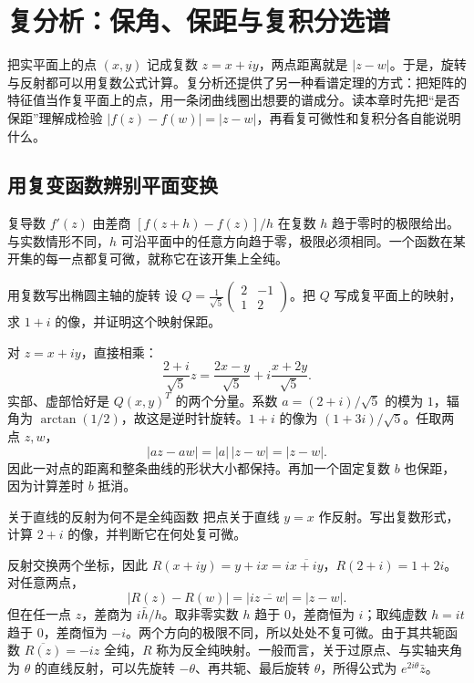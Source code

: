 \chapter{复分析：保角、保距与复积分选谱}
\label{chap:complex}

把实平面上的点 $(x,y)$ 记成复数 $z=x+iy$，两点距离就是 $|z-w|$。于是，旋转与反射都可以用复数公式计算。复分析还提供了另一种看谱定理的方式：把矩阵的特征值当作复平面上的点，用一条闭曲线圈出想要的谱成分。读本章时先把“是否保距”理解成检验 $|f(z)-f(w)|=|z-w|$，再看复可微性和复积分各自能说明什么。

\section{用复变函数辨别平面变换}

复导数 $f'(z)$ 由差商 $[f(z+h)-f(z)]/h$ 在复数 $h$ 趋于零时的极限给出。与实数情形不同，$h$ 可沿平面中的任意方向趋于零，极限必须相同。一个函数在某开集的每一点都复可微，就称它在该开集上全纯。

\begin{example}{用复数写出椭圆主轴的旋转}
设 $Q=\frac1{\sqrt5}\begin{pmatrix}2&-1\\1&2\end{pmatrix}$。把 $Q$ 写成复平面上的映射，求 $1+i$ 的像，并证明这个映射保距。
\end{example}
\begin{solution}
对 $z=x+iy$，直接相乘：
\[
 \frac{2+i}{\sqrt5}z=\frac{2x-y}{\sqrt5}+i\frac{x+2y}{\sqrt5}.
\]
实部、虚部恰好是 $Q(x,y)^T$ 的两个分量。系数 $a=(2+i)/\sqrt5$ 的模为 $1$，辐角为 $\arctan(1/2)$，故这是逆时针旋转。$1+i$ 的像为 $(1+3i)/\sqrt5$。任取两点 $z,w$，
\[
 |az-aw|=|a|\,|z-w|=|z-w|.
\]
因此一对点的距离和整条曲线的形状大小都保持。再加一个固定复数 $b$ 也保距，因为计算差时 $b$ 抵消。
\end{solution}

\begin{example}{关于直线的反射为何不是全纯函数}
把点关于直线 $y=x$ 作反射。写出复数形式，计算 $2+i$ 的像，并判断它在何处复可微。
\end{example}
\begin{solution}
反射交换两个坐标，因此 $R(x+iy)=y+ix=i\overline{x+iy}$，$R(2+i)=1+2i$。对任意两点，
\[
 |R(z)-R(w)|=|i\overline{z-w}|=|z-w|.
\]
但在任一点 $z$，差商为 $i\bar h/h$。取非零实数 $h$ 趋于 $0$，差商恒为 $i$；取纯虚数 $h=it$ 趋于 $0$，差商恒为 $-i$。两个方向的极限不同，所以处处不复可微。由于其共轭函数 $\overline{R(z)}=-iz$ 全纯，$R$ 称为反全纯映射。一般而言，关于过原点、与实轴夹角为 $\theta$ 的直线反射，可以先旋转 $-\theta$、再共轭、最后旋转 $\theta$，所得公式为 $e^{2i\theta}\bar z$。
\end{solution}

